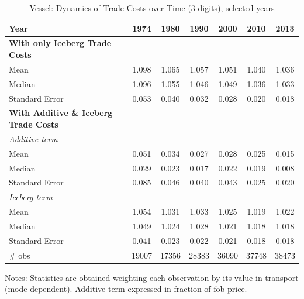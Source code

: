 \documentclass[a4paper,11pt]{article}
\begin{document}
\begin{table}[htbp]
  \centering
  \caption{Vessel: Dynamics of Trade Costs over Time (3 digits), selected years}
\begin{center}
    \begin{tabular}{l|cccccc}
   \hline\hline
Year         & 1974  & 1980  & 1990  & 2000  & 2010  & 2013   \\
 \hline
   \textbf{With only Iceberg Trade Costs} &       &       &       &       &       &       \\
Mean  & 1.098 & 1.065 & 1.057 & 1.051 & 1.040 & 1.036  \\
Median & 1.096 & 1.055 & 1.046 & 1.049 & 1.036 & 1.033  \\
Standard Error & 0.053 & 0.040 & 0.032 & 0.028 & 0.020 & 0.018  \\
\textbf{With Additive \& Iceberg Trade Costs} &       &       &       &       &       &     \\
\hline
\textit{Additive term } &       &       &       &       &       &        \\
Mean  & 0.051 & 0.034 & 0.027 & 0.028 & 0.025 & 0.015  \\
Median & 0.029 & 0.023 & 0.017 & 0.022 & 0.019 & 0.008 \\
Standard Error & 0.085 & 0.046 & 0.040 & 0.043 & 0.025 & 0.020 \\
\textit{Iceberg term} &       &       &       &       &       &        \\
Mean  & 1.054 & 1.031 & 1.033 & 1.025 & 1.019 & 1.022 \\
Median & 1.049 & 1.024 & 1.028 & 1.021 & 1.018 & 1.018  \\
Standard Error & 0.041 & 0.023 & 0.022 & 0.021 & 0.018 & 0.018  \\
\hline
 \# obs & 19007 & 17356 & 28383 & 36090 & 37748 & 38473 \\ \hline
\hline\hline
    \end{tabular}%
  \end{center}
  \label{tab:result_ves_3d_detail}%
\tiny{Notes: Statistics are obtained weighting each observation by its value in transport (mode-dependent). Additive term expressed in fraction of fob price. }
\end{table}%
\end{document}

